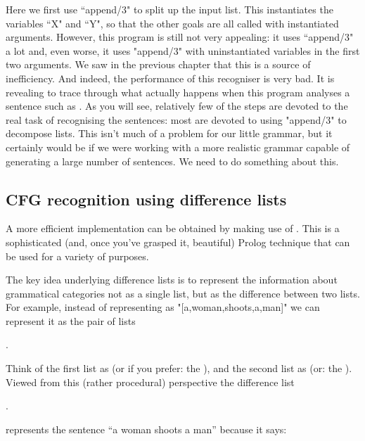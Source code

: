 Here we first use ``append/3" to split up the input list. This
instantiates the variables ``X" and ``Y", so that the other goals are
all called with instantiated arguments. However, this program is still
not very appealing: it uses ``append/3" a lot and, even worse, it uses
"append/3" with uninstantiated variables in the first two
arguments. We saw in the previous chapter that this is a source of
inefficiency. And indeed, the performance of this recogniser is very
bad.  It is revealing to trace through what actually happens when this
program analyses a sentence such as .
As you will see, relatively few of the steps are devoted to the real
task of recognising the sentences: most are devoted to using
"append/3" to decompose lists.  This isn't much of a problem for our
little grammar, but it certainly would be if we were working with a
more realistic grammar capable of generating a large number of
sentences. We need to do something about this.

\subsection*{CFG recognition using difference lists}\label{SUBSEC.L7.DIFF.STRUCTURES}



A more efficient implementation can be obtained by making use of
. This is a sophisticated (and, once you've
grasped it, beautiful) Prolog technique that can be used for a
variety of purposes.


The key idea underlying difference lists is to represent the
information about grammatical categories not as a single list, but as
the difference between two lists.  For example, instead of
representing  as
"[a,woman,shoots,a,man]" we can represent it as the pair of lists
\begin{LPNcodedisplay}
.
\end{LPNcodedisplay}
 Think of the first list as
 (or if you prefer:  the ), and the second list as  (or:
the ).  Viewed from this (rather procedural) perspective
the difference list
\begin{LPNcodedisplay}
.
\end{LPNcodedisplay}
 represents the sentence ``a woman shoots a man'' because it says:

